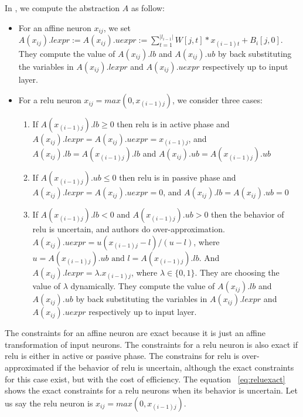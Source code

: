 In \deeppoly{}, we compute the abstraction $A$ as follow:
\begin{itemize}
\item For an affine neuron $x_{ij}$, we set 
  $A(x_{ij}).lexpr := A(x_{ij}).uexpr := \sum_{t=1}^{|l_{i-1}|} W[j,t]*x_{(i-1)t} + B_i[j,0]$.
  They compute the value of $A(x_{ij}).lb$ and $A(x_{ij}).ub$ by back substituting
  the variables in $A(x_{ij}).lexpr$ and $A(x_{ij}).uexpr$ respectively up to input layer.  
\item For a relu neuron $x_{ij} = max(0,x_{(i-1)j})$, we consider three cases:
            \begin{enumerate}
                \item If $A(x_{(i-1)j}).lb \geq 0$ then relu is in active phase and $A(x_{ij}).lexpr = A(x_{ij}).uexpr = x_{(i-1)j}$,
                        and $A(x_{ij}).lb = A(x_{(i-1)j}).lb$ and $A(x_{ij}).ub = A(x_{(i-1)j}).ub$
                \item If $A(x_{(i-1)j}).ub \leq 0$ then relu is in passive phase and $A(x_{ij}).lexpr = A(x_{ij}).uexpr = 0$, 
                        and $A(x_{ij}).lb = A(x_{ij}).ub = 0$
                \item  If $A(x_{(i-1)j}).lb < 0$ and $A(x_{(i-1)j}).ub > 0$ then the behavior of relu is uncertain, and authors
                        do over-approximation. $A(x_{ij}).uexpr = u(x_{(i-1)j} - l) / (u - l)$, 
                        where $u = A(x_{(i-1)j}).ub \text{ and } l = A(x_{(i-1)j}).lb$.
                        And $A(x_{ij}).lexpr = \lambda . x_{(i-1)j}$, where $\lambda \in \{0,1\}$. 
                        They are choosing the value of $\lambda$ dynamically. They compute the value of $A(x_{ij}).lb$ and $A(x_{ij}).ub$ 
                        by back substituting the variables in $A(x_{ij}).lexpr$ and $A(x_{ij}).uexpr$ respectively up to input layer. 
            \end{enumerate} 
\end{itemize}

The constraints for an affine neuron are exact because it is just an affine transformation of input neurons. 
The constraints for a relu neuron is also exact if relu is either in active or passive phase. 
The constrains for relu is over-approximated if the behavior of relu is uncertain, although the exact 
constraints for this case exist, but with the cost of efficiency. 
The equation ~\ref{eq:reluexact} shows the exact constraints
for a relu neurons when its behavior is uncertain. Let us say the relu neuron is $x_{ij} = max(0,x_{(i-1)j})$. 


